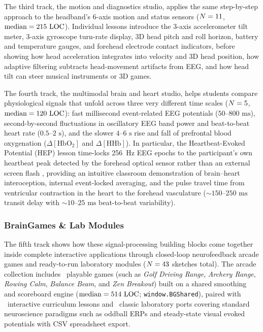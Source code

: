 \documentclass[11pt]{article}
\begin{document}
The third track, the motion and diagnostics studio, applies the same step-by-step approach to the headband's 6-axis motion and status sensors \citep{rosanne2021adaptive,klug2022bemobil} ($N = 11$, $\text{median} = 215\text{ LOC}$). Individual lessons introduce the 3-axis accelerometer tilt meter, 3-axis gyroscope turn-rate display, 3D head pitch and roll horizon, battery and temperature gauges, and forehead electrode contact indicators, before showing how head acceleration integrates into velocity and 3D head position, how adaptive filtering subtracts head-movement artifacts from EEG, and how head tilt can steer musical instruments or 3D games.

The fourth track, the multimodal brain and heart studio, helps students compare physiological signals that unfold across three very different time scales \citep{makowski2021neurokit2,cannard2024brainbeats} ($N = 5$, $\text{median} = 120\text{ LOC}$): fast millisecond event-related EEG potentials ($50\text{--}800\text{ ms}$), second-by-second fluctuations in oscillatory EEG band power and beat-to-beat heart rate ($0.5\text{--}2\text{ s}$), and the slower $4\text{--}6\text{ s}$ rise and fall of prefrontal blood oxygenation ($\Delta[\text{HbO}_2]$ and $\Delta[\text{HHb}]$). In particular, the Heartbeat-Evoked Potential (HEP) lesson time-locks 256~Hz EEG epochs to the participant's own heartbeat peak detected by the forehead optical sensor rather than an external screen flash \citep{cannard2024brainbeats,steinfath2025validating}, providing an intuitive classroom demonstration of brain--heart interoception, internal event-locked averaging, and the pulse travel time from ventricular contraction in the heart to the forehead vasculature ($\sim 150\text{--}250\text{ ms}$ transit delay with $\sim 10\text{--}25\text{ ms}$ beat-to-beat variability).

\subsubsection{BrainGames \& Lab Modules}
The fifth track shows how these signal-processing building blocks come together inside complete interactive applications through closed-loop neurofeedback arcade games and ready-to-run laboratory modules ($N = 43$ sketches total). The arcade collection includes \NBrainGames\ playable games (such as \emph{Golf Driving Range}, \emph{Archery Range}, \emph{Rowing Calm}, \emph{Balance Beam}, and \emph{Zen Breakout}) built on a shared smoothing and scoreboard engine ($\text{median} = 514\text{ LOC}$; \texttt{window.BGShared}), paired with \NEEGEduModules\ interactive curriculum lessons and \NClassicEEGEdu\ classic laboratory ports covering standard neuroscience paradigms such as oddball ERPs and steady-state visual evoked potentials with CSV spreadsheet export.
\end{document}
